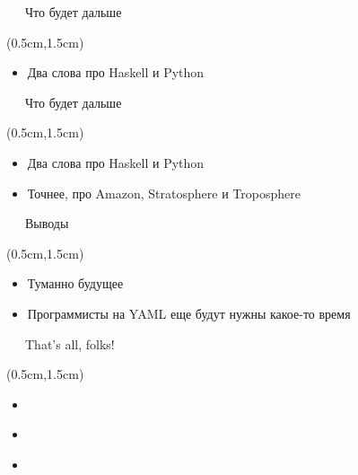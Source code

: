 \documentclass[xetex,18pt,aspectratio=43]{beamer}
\begin{document}
\begin{Large}
\begin{frame}{\ \ \ Что будет дальше}
\begin{textblock*}{\framewidth-0.8cm}(0.5cm,1.5cm)
\begin{itemize}
  \item Два слова про Haskell и Python
\end{itemize}
\end{textblock*}
\end{frame}

\begin{frame}{\ \ \ Что будет дальше}
\begin{textblock*}{\framewidth-0.8cm}(0.5cm,1.5cm)
\begin{itemize}
  \item Два слова про Haskell и Python
  \item Точнее, про Amazon, Stratosphere и Troposphere
\end{itemize}
\end{textblock*}
\end{frame}

\begin{frame}{\ \ \ Выводы}
\begin{textblock*}{\framewidth-0.8cm}(0.5cm,1.5cm)
\begin{itemize}
  \item Туманно будущее
  \item Программисты на YAML еще будут нужны какое-то время
\end{itemize}
\end{textblock*}
\end{frame}

\begin{frame}{\ \ \ That's all, folks!}
\begin{textblock*}{\framewidth-0.8cm}(0.5cm,1.5cm)
\begin{itemize}
  \item \href{mailto:alexclear@gmail.com}{\color{blue}{alexclear@gmail.com}}
  \item \href{https://telegram.me/lhommequipleure}{\color{blue}{https://telegram.me/lhommequipleure}}
  \item \href{https://telegram.me/demeliorator\_pod}{\color{blue}{https://telegram.me/demeliorator\_pod}}
\end{itemize}
\end{textblock*}
\end{frame}

\end{Large}
\end{document}

